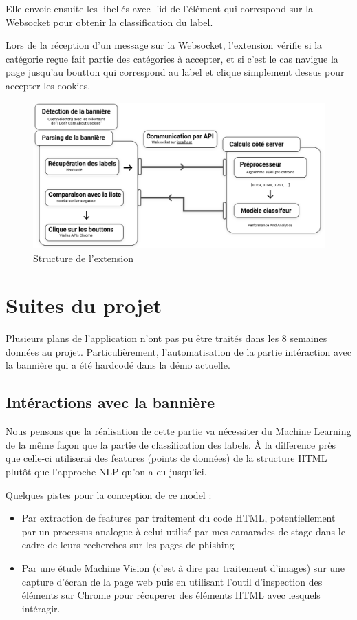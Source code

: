 \documentclass[oneside,a4paper,12pt]{article}
\begin{document}
	Elle envoie ensuite les libellés avec l'id de l'élément qui correspond sur la Websocket pour obtenir la classification du label.
	
	\label{Interaction}
	Lors de la réception d'un message sur la Websocket, l'extension vérifie si la catégorie reçue fait partie des catégories à accepter, et si c'est le cas navigue la page jusqu'au boutton qui correspond au label et clique simplement dessus pour accepter les cookies.
	
	\begin{figure}[h]
		\centering
		\includegraphics[width=\linewidth]{structure.png}
		\caption{Structure de l'extension}
	\end{figure}

	\section{Suites du projet}
	
	Plusieurs plans de l'application n'ont pas pu être traités dans les 8 semaines données au projet. Particulièrement, l'automatisation de la partie intéraction avec la bannière qui a été hardcodé dans la démo actuelle.
	
	\subsection{Intéractions avec la bannière}
	Nous pensons que la réalisation de cette partie va nécessiter du Machine Learning de la même façon que la partie de classification des labels. \`A la difference près que celle-ci utiliserai des features (points de données) de la structure HTML plutôt que l'approche NLP qu'on a eu jusqu'ici.
	
	Quelques pistes pour la conception de ce model :
	\begin{itemize}
		\item Par extraction de features par traitement du code HTML, potentiellement par un processus analogue à celui utilisé par mes camarades de stage dans le cadre de leurs recherches sur les pages de phishing \cite{phishing}
		\item Par une étude Machine Vision (c'est à dire par traitement d'images) sur une capture d'écran de la page web puis en utilisant l'outil d'inspection des éléments sur Chrome pour récuperer des éléments HTML avec lesquels intéragir.
	\end{itemize}
	
\end{document}
